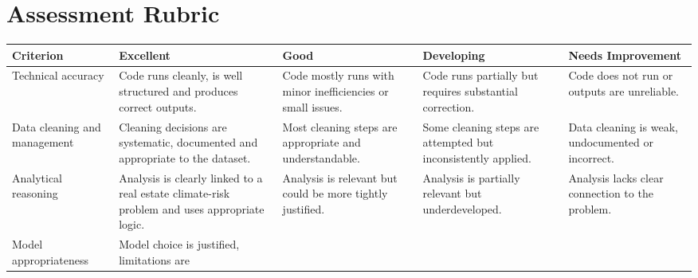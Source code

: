 \documentclass[
  a4paper,
]{article}
\newcounter{none} %
\begin{document}
\section{Assessment Rubric}\label{assessment-rubric}

{\def\LTcaptype{none} %
\begin{longtable}[]{@{}
  >{\raggedright\arraybackslash}p{}
  >{\raggedright\arraybackslash}p{}
  >{\raggedright\arraybackslash}p{}
  >{\raggedright\arraybackslash}p{}
  >{\raggedright\arraybackslash}p{}@{}}
\toprule\noalign{}
\begin{minipage}[b]{\linewidth}\raggedright
Criterion
\end{minipage} & \begin{minipage}[b]{\linewidth}\raggedright
Excellent
\end{minipage} & \begin{minipage}[b]{\linewidth}\raggedright
Good
\end{minipage} & \begin{minipage}[b]{\linewidth}\raggedright
Developing
\end{minipage} & \begin{minipage}[b]{\linewidth}\raggedright
Needs Improvement
\end{minipage} \\
\midrule\noalign{}
\endhead
\bottomrule\noalign{}
\endlastfoot
Technical accuracy & Code runs cleanly, is well structured and produces
correct outputs. & Code mostly runs with minor inefficiencies or small
issues. & Code runs partially but requires substantial correction. &
Code does not run or outputs are unreliable. \\
Data cleaning and management & Cleaning decisions are systematic,
documented and appropriate to the dataset. & Most cleaning steps are
appropriate and understandable. & Some cleaning steps are attempted but
inconsistently applied. & Data cleaning is weak, undocumented or
incorrect. \\
Analytical reasoning & Analysis is clearly linked to a real estate
climate-risk problem and uses appropriate logic. & Analysis is relevant
but could be more tightly justified. & Analysis is partially relevant
but underdeveloped. & Analysis lacks clear connection to the problem. \\
Model appropriateness & Model choice is justified, limitations are

\end{longtable}}
\end{document}
